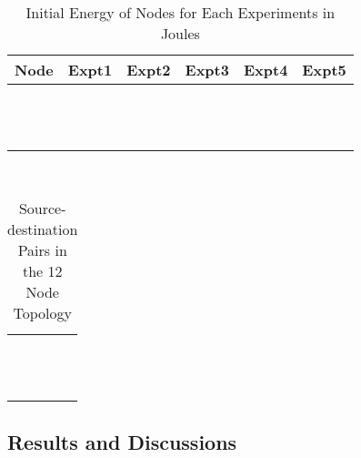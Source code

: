 \begin{table}[htbp]
\centering
  \caption{Initial Energy of Nodes for Each Experiments in Joules}
  \hfill \\	
  \begin{tabular}{|c|c|c|c|c|c|}
  \hline
  Node & Expt1 & Expt2 & Expt3 & Expt4 & Expt5 \\
  \hline
   &  &  &  &  &  \\
  \hline
   &  &  &  &  &  \\
  \hline
   &  &  &  &  &  \\
  \hline
   &  &  &  &  &  \\
  \hline
   &  &  &  &  &  \\
  \hline
   &  &  &  &  &  \\
  \hline
   &  &  &  &  &  \\
  \hline
   &  &  &  &  &  \\
  \hline
   &  &  &  &  &  \\
  \hline
   &  &  &  &  &  \\
  \hline
   &  &  &  &  &  \\
  \hline
   &  &  &  &  &  \\
  \hline
  \end{tabular}
  \label{tab52}
\end{table}

\begin{table}[htbp]
\centering
  \caption{Source-destination Pairs in the 12 Node Topology}
  \hfill \\	
  \begin{tabular}{|c|c|c|c|}
  \hline
   & \\
  \hline
   & \\
  \hline
   & \\
  \hline
   & \\
  \hline
   & \\
  \hline
   & \\
  \hline
   & \\
  \hline
   & \\
  \hline
   & \\
  \hline
   & \\
  \hline
   & \\
  \hline
   & \\
  \hline
   & \\
  \hline
  \end{tabular}
  \label{tab53}
\end{table}

\subsection{Results and Discussions}

